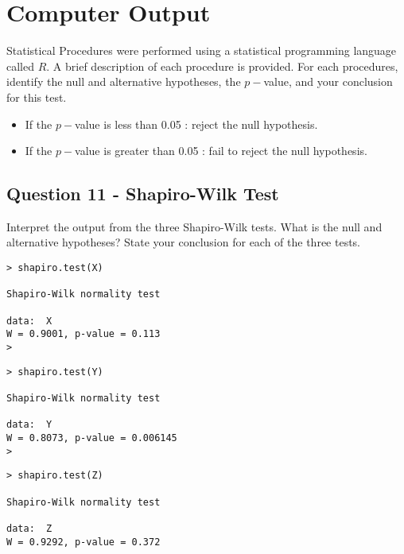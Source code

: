 
\section{Computer Output}
Statistical Procedures were performed using a statistical programming language called $R$.
A brief description of each procedure is provided. For each procedures, identify the null and alternative hypotheses, the $p-$value, and your conclusion for this test.


\begin{itemize}
\item If the $p-$value is less than 0.05 : reject the null hypothesis.
\item If the $p-$value is greater than 0.05 : fail to reject the null hypothesis.
\end{itemize}

\subsection*{Question 11 - Shapiro-Wilk Test}
Interpret the output from the three Shapiro-Wilk tests. What is the null and alternative hypotheses? State your conclusion for each of the three tests.
\begin{framed}
\begin{verbatim}
> shapiro.test(X)

Shapiro-Wilk normality test

data:  X
W = 0.9001, p-value = 0.113
>
\end{verbatim}
\end{framed}
\begin{framed}
\begin{verbatim}
> shapiro.test(Y)

Shapiro-Wilk normality test

data:  Y 
W = 0.8073, p-value = 0.006145
>
\end{verbatim}
\end{framed}
\begin{framed}
\begin{verbatim}
> shapiro.test(Z)

Shapiro-Wilk normality test

data:  Z
W = 0.9292, p-value = 0.372
\end{verbatim}
\end{framed}
